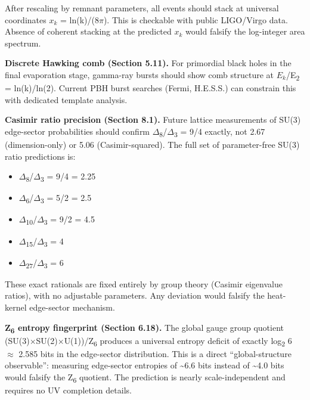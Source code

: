 \documentclass[11pt,a4paper]{article}
\theoremstyle{remark}
\providecommand{\tightlist}{%
  \setlength{\itemsep}{0pt}\setlength{\parskip}{0pt}}
\begin{document}
After rescaling by remnant parameters, all events should stack at universal coordinates \(x_k\) = ln(k)/(8\ensuremath{\pi}). This is checkable with public LIGO/Virgo data. Absence of coherent stacking at the predicted \(x_k\) would falsify the log-integer area spectrum.

\textbf{Discrete Hawking comb (Section 5.11).} For primordial black holes in the final evaporation stage, gamma-ray bursts should show comb structure at \(E_k\)/E\textsubscript{2} = ln(k)/ln(2). Current PBH burst searches (Fermi, H.E.S.S.) can constrain this with dedicated template analysis.

\textbf{Casimir ratio precision (Section 8.1).} Future lattice measurements of SU(3) edge-sector probabilities should confirm \ensuremath{\Delta}\textsubscript{8}/\ensuremath{\Delta}\textsubscript{3} = 9/4 exactly, not 2.67 (dimension-only) or 5.06 (Casimir-squared). The full set of parameter-free SU(3) ratio predictions is:

\begin{itemize}
\tightlist
\item
  \ensuremath{\Delta}\textsubscript{8}/\ensuremath{\Delta}\textsubscript{3} = 9/4 = 2.25
\item
  \ensuremath{\Delta}\textsubscript{6}/\ensuremath{\Delta}\textsubscript{3} = 5/2 = 2.5
\item
  \ensuremath{\Delta}\textsubscript{10}/\ensuremath{\Delta}\textsubscript{3} = 9/2 = 4.5
\item
  \ensuremath{\Delta}\textsubscript{15}/\ensuremath{\Delta}\textsubscript{3} = 4
\item
  \ensuremath{\Delta}\textsubscript{27}/\ensuremath{\Delta}\textsubscript{3} = 6
\end{itemize}

These exact rationals are fixed entirely by group theory (Casimir eigenvalue ratios), with no adjustable parameters. Any deviation would falsify the heat-kernel edge-sector mechanism.

\textbf{Z\textsubscript{6} entropy fingerprint (Section 6.18).} The global gauge group quotient (SU(3)\ensuremath{\times}SU(2)\ensuremath{\times}U(1))/Z\textsubscript{6} produces a universal entropy deficit of exactly log\textsubscript{2} 6 \ensuremath{\approx} 2.585 bits in the edge-sector distribution. This is a direct ``global-structure observable'': measuring edge-sector entropies of \textasciitilde6.6 bits instead of \textasciitilde4.0 bits would falsify the Z\textsubscript{6} quotient. The prediction is nearly scale-independent and requires no UV completion details.
\end{document}
